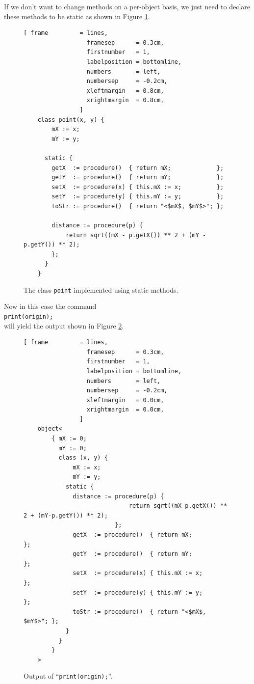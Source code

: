 \documentclass[11pt]{report}
\begin{document}
If we don't want to change methods on a per-object basis, we just need to declare these methods to be static as shown in Figure \ref{fig:point-static.stlx}.

\begin{figure}[!htb]
\centering
\begin{Verbatim}[ frame         = lines, 
                  framesep      = 0.3cm, 
                  firstnumber   = 1,
                  labelposition = bottomline,
                  numbers       = left,
                  numbersep     = -0.2cm,
                  xleftmargin   = 0.8cm,
                  xrightmargin  = 0.8cm,
                ]
    class point(x, y) {
        mX := x;
        mY := y;
    
      static {
        getX  := procedure()  { return mX;             };
        getY  := procedure()  { return mY;             };
        setX  := procedure(x) { this.mX := x;          };
        setY  := procedure(y) { this.mY := y;          };
        toStr := procedure()  { return "<$mX$, $mY$>"; };
 
        distance := procedure(p) {
            return sqrt((mX - p.getX()) ** 2 + (mY - p.getY()) ** 2);
        };
      }
    }
\end{Verbatim}
\vspace*{-0.3cm}
\caption{The class \texttt{point} implemented using static methods.}
\label{fig:point-static.stlx}
\end{figure}

Now in this case the command 
\\[0.2cm]
\hspace*{1.3cm}
\texttt{print(origin);}
\\[0.2cm]
will yield the output shown in Figure \ref{fig:point-static.stlx-origin}.

\begin{figure}[!ht]
\centering
\begin{Verbatim}[ frame         = lines, 
                  framesep      = 0.3cm, 
                  firstnumber   = 1,
                  labelposition = bottomline,
                  numbers       = left,
                  numbersep     = -0.2cm,
                  xleftmargin   = 0.0cm,
                  xrightmargin  = 0.0cm,
                ]
    object<
        { mX := 0; 
          mY := 0; 
          class (x, y) { 
              mX := x; 
              mY := y; 
            static { 
              distance := procedure(p) { 
                              return sqrt((mX-p.getX()) ** 2 + (mY-p.getY()) ** 2); 
                          }; 
              getX  := procedure()  { return mX;             }; 
              getY  := procedure()  { return mY;             }; 
              setX  := procedure(x) { this.mX := x;          }; 
              setY  := procedure(y) { this.mY := y;          }; 
              toStr := procedure()  { return "<$mX$, $mY$>"; }; 
            } 
          } 
        }
    >
\end{Verbatim}
\vspace*{-0.3cm}
\caption{Output of ``\texttt{print(origin);}''.}
\label{fig:point-static.stlx-origin}
\end{figure}
\end{document}
